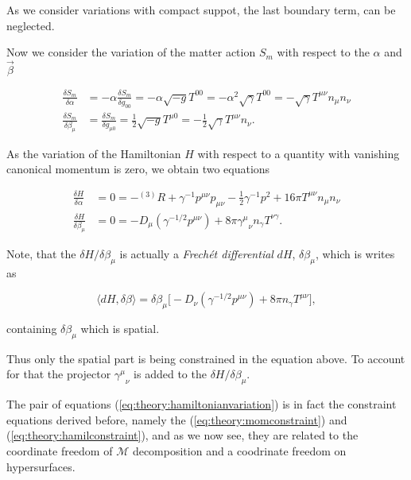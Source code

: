 As we consider variations with compact suppot, the last boundary term, can be neglected.


Now we consider the variation of the matter action $S_m$ with respect to the $\alpha$ and $\vec{\beta}$

\begin{align}
\frac{\delta S_m}{\delta \alpha} &=-\alpha\frac{\delta S_m}{\delta g_{00}} = -\alpha\sqrt{-g}T^{00} = -\alpha^2\sqrt{\gamma}T^{00} = -\sqrt{\gamma}T^{\mu\nu}n_{\mu}n_{\nu} \\
\frac{\delta S_m}{\delta \beta_{\mu}} &= \frac{\delta S_m}{\delta g_{\mu 0}} =\frac{1}{2}\sqrt{-g}T^{\mu 0} = -\frac{1}{2} \sqrt{\gamma}T^{\mu\nu}n_{\nu}.
\end{align}

As the variation of the Hamiltonian $H$ with respect to a quantity with vanishing canonical momentum is zero, we obtain two equations 

\begin{align}
\frac{\delta H}{\delta \alpha} &= 0 = -{^{(3)}R} + \gamma^{-1}p^{\mu\nu}p_{\mu\nu}-\frac{1}{2}\gamma^{-1}p^2 + 16\pi T^{\mu\nu}n_{\mu}n_{\nu} \\
\frac{\delta H}{\delta \beta_{\mu}} &= 0 = - D_{\mu}(\gamma^{-1/2}p^{\mu\nu}) + 8\pi{\gamma^{\mu}}_{\nu}n_{\gamma}T^{\nu\gamma}.
\label{eq:theory:hamiltonianvariation}
\end{align}

Note, that the $\delta H / \delta\beta_{\mu}$ is actually a \textit{Frech\'et differential} $dH$, $\delta \beta_{\mu}$, which is writes as

\begin{equation}
\langle dH,\delta\beta \rangle = \delta\beta_{\mu}\big[-D_{\nu}(\gamma^{-1/2}p^{\mu\nu})+8\pi n_{\gamma}T^{\mu\nu}\big], 
\end{equation}

containing $\delta\beta_{\mu}$ which is spatial. 

Thus only the spatial part is being constrained in the equation above. 
To account for that the projector ${\gamma^{\mu}}_{\nu}$ is added to the $\delta H/\delta \beta_{\mu}$.

The pair of equations (\ref{eq:theory:hamiltonianvariation}) is in fact the constraint equations derived before, namely the (\ref{eq:theory:momconstraint}) and (\ref{eq:theory:hamilconstraint}), and as we now see, they are related to the coordinate freedom of $\mathcal{M}$ decomposition and a coodrinate freedom on hypersurfaces.

